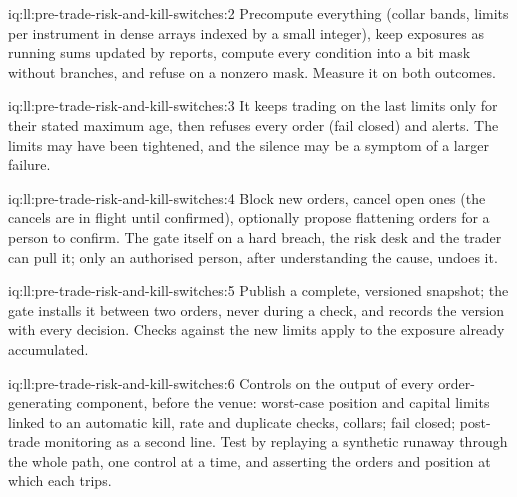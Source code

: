 \begin{solution}{iq:ll:pre-trade-risk-and-kill-switches:2}
Precompute everything (collar bands, limits per instrument in dense arrays indexed by a small integer), keep exposures as
running sums updated by reports, compute every condition into a bit mask without branches, and refuse on a nonzero mask. Measure
it on both outcomes.
\end{solution}

\begin{solution}{iq:ll:pre-trade-risk-and-kill-switches:3}
It keeps trading on the last limits only for their stated maximum age, then refuses every order (fail closed) and alerts. The
limits may have been tightened, and the silence may be a symptom of a larger failure.
\end{solution}

\begin{solution}{iq:ll:pre-trade-risk-and-kill-switches:4}
Block new orders, cancel open ones (the cancels are in flight until confirmed), optionally propose flattening orders for a
person to confirm. The gate itself on a hard breach, the risk desk and the trader can pull it; only an authorised person, after
understanding the cause, undoes it.
\end{solution}

\begin{solution}{iq:ll:pre-trade-risk-and-kill-switches:5}
Publish a complete, versioned snapshot; the gate installs it between two orders, never during a check, and records the version
with every decision. Checks against the new limits apply to the exposure already accumulated.
\end{solution}

\begin{solution}{iq:ll:pre-trade-risk-and-kill-switches:6}
Controls on the output of every order-generating component, before the venue: worst-case position and capital limits linked to
an automatic kill, rate and duplicate checks, collars; fail closed; post-trade monitoring as a second line. Test by replaying a
synthetic runaway through the whole path, one control at a time, and asserting the orders and position at which each trips.
\end{solution}
